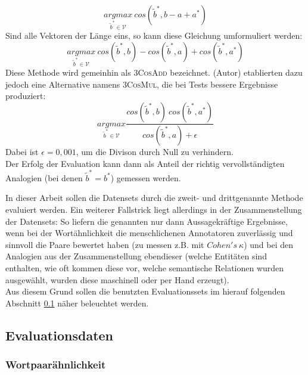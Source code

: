 \begin{enumerate}
      \begin{equation}
        \underset{\tilde{b}^* \in \mathcal{V}}{argmax}\ cos(\tilde{b}^*, b - a + a^*)
      \end{equation}
      Sind alle Vektoren der Länge eins, so kann diese Gleichung umformuliert werden:
      \begin{equation}
        \underset{\tilde{b}^* \in \mathcal{V}}{argmax}\ cos(\tilde{b}^*, b) - cos(\tilde{b}^*, a) + cos(\tilde{b}^*, a^*)
      \end{equation}
      Diese Methode wird gemeinhin als \textsc{3CosAdd} bezeichnet. (Autor) etablierten dazu jedoch
      eine Alternative namens \textsc{3CosMul}, die bei Tests bessere Ergebnisse produziert:
      \begin{equation}
        \underset{\tilde{b}^* \in \mathcal{V}}{argmax} \frac{cos(\tilde{b}^*, b)\ cos(\tilde{b}^*, a^*)}{cos(\tilde{b}^*, a) + \epsilon}
      \end{equation}
      Dabei ist $\epsilon = 0,001$, um die Divison durch Null zu verhindern.\\
      Der Erfolg der Evaluation kann dann als Anteil der richtig vervollständigten Analogien (bei denen $\tilde{b}^* = b^*$) gemessen werden.
  \end{enumerate}
  In dieser Arbeit sollen die Datensets durch die zweit- und drittgenannte Methode evaluiert werden.
  Ein weiterer Fallstrick liegt allerdings in der Zusammenstellung der Datensets: So liefern
  die genannten nur dann Aussagekräftige Ergebnisse, wenn bei der Wortähnlichkeit die menschlichenen Annotatoren
  zuverlässig und sinnvoll die Paare bewertet haben (zu messen z.B. mit $Cohen's\ \kappa$) und bei
  den Analogien aus der Zusammenstellung ebendieser (welche Entitäten sind enthalten, wie oft kommen diese vor,
  welche semantische Relationen wurden ausgewählt, wurden diese maschinell oder per Hand erzeugt).\\
  Aus diesem Grund sollen die benutzten Evaluationssets im hierauf folgenden Abschnitt \ref{sec:evaldata} näher beleuchtet werden.

  \subsection{Evaluationsdaten}\label{sec:evaldata}

    \subsubsection{Wortpaarähnlichkeit}

